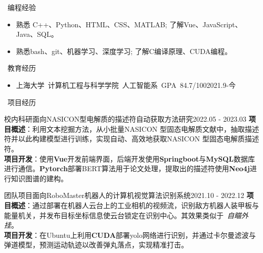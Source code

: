 \documentclass[UTF8]{resume}
\begin{document}
  
\begin{rSection}{\faCogs~编程经验}
    \begin{itemize}
        \itemsep -0.5em
        \item 熟悉 C++、Python、HTML、CSS、MATLAB; 了解Vue、JavaScript、Java、SQL。
        \item 熟悉bash、git、机器学习、深度学习; 了解C编译原理、CUDA编程。
    \end{itemize} 
\end{rSection}

\begin{rSection}{\faGraduationCap~教育经历}
    \begin{itemize}
        \item 上海大学~计算机工程与科学学院~人工智能系~GPA~84.7/100\hfill 2021.9-今
    \end{itemize}
\end{rSection}
 

\begin{rSection}{\faUsers~项目经历}

    \begin{rProject}{校内科研}{面向NASICON型电解质的描述符自动获取方法研究}{2022.05 - 2023.03}
        \textbf{项目概述}：利用文本挖掘方法，从小批量NASICON 型固态电解质文献中，抽取描述符并以此构建模型进行训练，实现自动、高效地获取NASICON 型固态电解质描述符。\\
        \textbf{项目开发}：使用\textbf{Vue}开发前端界面，后端开发使用\textbf{Springboot}与\textbf{MySQL}数据库进行通信。\textbf{Pytorch}部署BERT算法用于论文处理，提取出的描述符使用\textbf{Neo4j}进行知识图谱的建构。
    \end{rProject}

    \begin{rProject}{团队项目}{面向RoboMaster机器人的计算机视觉算法识别系统}{2021.10 - 2022.12}
        \textbf{项目概述}：通过部署在机器人云台上的工业相机的视频流，识别敌方机器人装甲板与能量机关，并发布目标坐标信息使云台锁定在识别中心。其效果类似于~\textit{自瞄外挂}。\\
        \textbf{项目开发}：在Ubuntu上利用\textbf{CUDA}部署yolo网络进行识别，并通过卡尔曼滤波与弹道模型，预测运动轨迹以改善弹丸落点，实现精准打击。
    \end{rProject}

\end{rSection}
\end{document}
